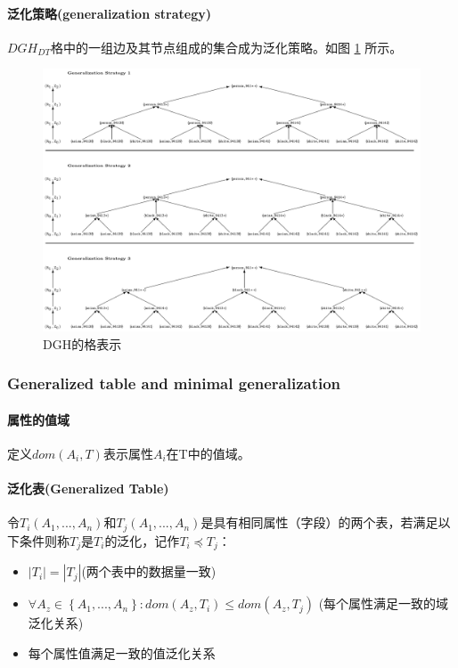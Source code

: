 \documentclass[12pt,a4paper]{article}
\begin{document}
\paragraph{泛化策略(generalization strategy)} $DGH_{DT}$格中的一组边及其节点组成的集合成为泛化策略。如图 \ref{generalization-strategy} 所示。
\begin{figure}[H]
	\centering
	\includegraphics[width=1\textwidth]{../images/generalization-strategy.png}
	\caption{DGH的格表示}
	\label{generalization-strategy}
\end{figure}

\subsubsection{Generalized table and minimal generalization}
\paragraph{属性的值域} 定义$dom(A_i,T)$表示属性$A_i$在T中的值域。
\paragraph{泛化表(Generalized Table)} 令$T_i(A_1,...,A_n)$和$T_j(A_1,...,A_n)$是具有相同属性（字段）的两个表，若满足以下条件则称$T_j$是$T_i$的泛化，记作$T_i \preceq T_j$：
\begin{itemize}
	\item $|T_i| = |T_j|$(两个表中的数据量一致)
	\item $\forall A_z \in \left \{ A_1,...,A_n \right \}: dom(A_z, T_i) \leq dom(A_z, T_j)$ (每个属性满足一致的域泛化关系)
	\item 每个属性值满足一致的值泛化关系
\end{itemize}
\end{document}

